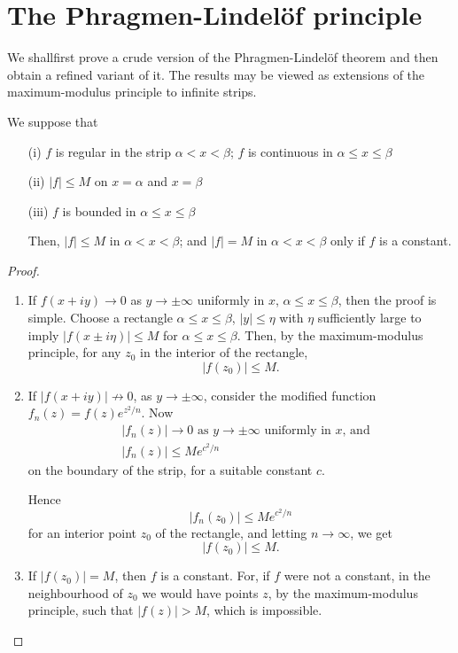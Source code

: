 
\chapter{The Phragmen-Lindel\"of principle}\label{chap2}

We shall\pageoriginale first prove a crude version of the
Phragmen-Lindel\"of theorem and then obtain a refined variant of it. The
results may be viewed as extensions of the maximum-modulus principle
to infinite strips.

\setcounter{thm}{0}
\begin{thm}\label{chap2:thm1}
\cite[p.168]{key6} We suppose that
\begin{itemize}
\item[(i)] $f$ is regular in the strip $\alpha < x < \beta$; $f$ is
  continuous in $\alpha \leq x \leq \beta$

\item[(ii)] $|f| \leq M$ on $x = \alpha$ and $x = \beta$

\item[(iii)] $f$ is bounded in $\alpha \leq x \leq \beta$

Then, $|f| \leq M$ in $\alpha < x < \beta$; and $|f| = M$ in $\alpha <
x < \beta$ only if $f$ is a constant.
 \end{itemize}
\end{thm}

\begin{proof}
\begin{enumerate}
\renewcommand{\theenumi}{\roman{enumi}}
\renewcommand{\labelenumi}{(\theenumi)}
\item If $f(x+iy) \to 0$ as $y \to \pm \infty$ uniformly in $x$,
  $\alpha \leq x \leq \beta$, then the proof is simple. Choose a
  rectangle $\alpha \leq x \leq \beta$, $|y| \leq \eta$ with $\eta$
  sufficiently large to imply $|f(x \pm i \eta)| \leq M$ for $\alpha
  \leq x \leq \beta$. Then, by the maximum-modulus principle, for any
  $z_0$ in the interior of the rectangle,
$$
|f(z_0)| \leq M.
$$

\item If $|f(x+iy)| \not\to 0$, as $y \to \pm \infty$, consider the
  modified function $f_n (z) = f(z) e^{z^2 / n}$. Now
\begin{align*}
& |f_n(z)| \to 0 \text{ as } y \to \pm \infty \text{ uniformly in 
  $x$, and} \\
& |f_n (z)|  \leq M e^{c^2/n}
\end{align*}
on the boundary of the strip, for a suitable constant $c$.

Hence\pageoriginale
$$
|f_n (z_0)| \leq M e^{c^2/n}
$$
for an interior point $z_0$ of the rectangle, and letting $n \to
\infty$, we get
$$
|f(z_0)| \leq M.
$$

\item If $|f(z_0)| = M$, then $f$ is a constant. For, if $f$ were not
  a constant, in the neighbourhood of $z_0$ we would have points $z$,
  by the maximum-modulus principle, such that $|f(z)| > M$, which is
  impossible. 
\end{enumerate}
\end{proof}

